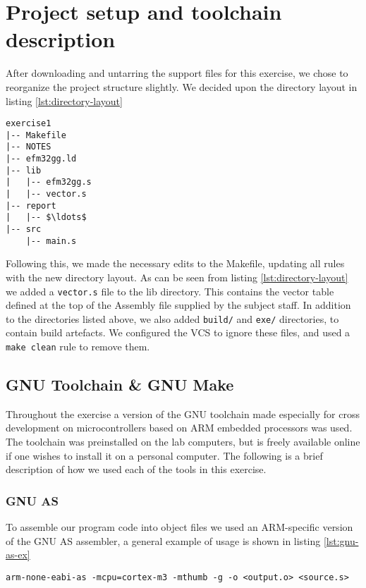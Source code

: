 \section{Project setup and toolchain description}

After downloading and untarring the support files for this exercise, we chose to reorganize the project structure slightly. We decided upon the directory layout in listing \ref{lst:directory-layout}

\begin{lstlisting}[label=lst:directory-layout,caption=Directory layout, mathescape]
exercise1
|-- Makefile
|-- NOTES
|-- efm32gg.ld
|-- lib
|   |-- efm32gg.s
|   |-- vector.s
|-- report
|   |-- $\ldots$
|-- src
    |-- main.s
\end{lstlisting}

Following this, we made the necessary edits to the Makefile, updating all rules with the new directory layout. As can be seen from listing \ref{lst:directory-layout} we added a \texttt{vector.s} file to the lib directory. This contains the vector table defined at the top of the Assembly file supplied by the subject staff. In addition to the directories listed above, we also added \texttt{build/} and \texttt{exe/} directories, to contain build artefacts. We configured the VCS to ignore these files, and used a \texttt{make clean} rule to remove them.

\subsection{GNU Toolchain \& GNU Make}

Throughout the exercise a version of the GNU toolchain made especially for cross development on microcontrollers based on ARM embedded processors was used. The toolchain was preinstalled on the lab computers, but is freely available online if one wishes to install it on a personal computer. The following is a brief description of how we used each of the tools in this exercise.

\subsubsection{GNU AS}

To assemble our program code into object files we used an ARM-specific version of the GNU AS assembler, a general example of usage is shown in listing \ref{lst:gnu-as-ex}

\begin{lstlisting}[label=lst:gnu-as-ex,caption=Assembler usage]
arm-none-eabi-as -mcpu=cortex-m3 -mthumb -g -o <output.o> <source.s>
\end{lstlisting}

